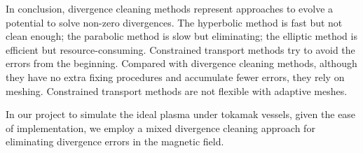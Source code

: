 In conclusion, divergence cleaning methods represent approaches to evolve a potential to solve non-zero divergences. The hyperbolic method is fast but not clean enough; the parabolic method is slow but eliminating; the elliptic method is efficient but resource-consuming. Constrained transport methods try to avoid the errors from the beginning. Compared with divergence cleaning methods, although they have no extra fixing procedures and accumulate fewer errors, they rely on meshing. Constrained transport methods are not flexible with adaptive meshes.

In our project to simulate the ideal plasma under tokamak vessels, given the ease of implementation, we employ a mixed divergence cleaning approach for eliminating divergence errors in the magnetic field.



